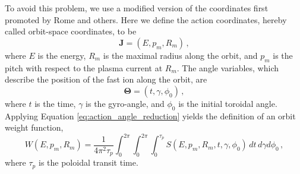 To avoid this problem, we use a modified version of the coordinates first promoted by Rome\cite{rome1979} and others\cite{petrov2016}.
Here we define the action coordinates, hereby called orbit-space coordinates, to be
\begin{equation}\label{eq:orbit_action}
    \mathbf{J} = (E, p_m, R_m)\,,
\end{equation}
where $E$ is the energy, $R_m$ is the maximal radius along the orbit, and $p_m$ is the pitch with respect to the plasma current at $R_m$.
The angle variables, which describe the position of the fast ion along the orbit, are
\begin{equation}\label{eq:orbit_angle}
    \mathbf{\Theta} = (t, \gamma, \phi_0)\,,
\end{equation}
where $t$ is the time, $\gamma$ is the gyro-angle, and $\phi_0$ is the initial toroidal angle.
Applying Equation \ref{eq:action_angle_reduction} yields the definition of an orbit weight function,
\begin{equation}\label{eq:orbit_weight}
    W(E,p_m,R_{m}) = \frac{1}{4\pi^2 \tau_p}\int_0^{2\pi} \int_0^{2\pi} \int_0^{\tau_p} S(E,p_m,R_{m},t,\gamma,\phi_0)\,dt\, d\gamma d\phi_0\,,
\end{equation}
where $\tau_p$ is the poloidal transit time.

